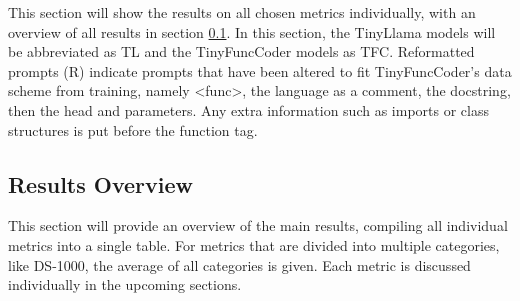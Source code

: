 This section will show the results on all chosen metrics individually, with an overview of all results in section \ref{sec:resoverview}.
In this section, the TinyLlama models will be abbreviated as TL and the TinyFuncCoder models as TFC.
Reformatted prompts (R) indicate prompts that have been altered to fit TinyFuncCoder's data scheme from training, namely <func>, the language as a comment, the docstring, then the head and parameters.
Any extra information such as imports or class structures is put before the function tag.

\subsection{Results Overview}
\label{sec:resoverview}
This section will provide an overview of the main results, compiling all individual metrics into a single table.
For metrics that are divided into multiple categories, like DS-1000, the average of all categories is given.
Each metric is discussed individually in the upcoming sections.

